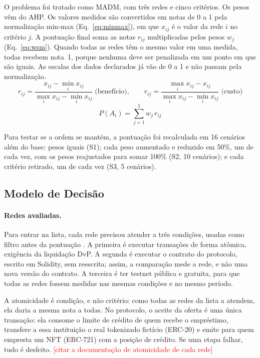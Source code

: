 \documentclass[10pt,a4paper]{article}
\newcommand{\pendente}[1]{\textcolor{red}{[#1]}}
\begin{document}
O problema foi tratado como MADM, com três redes e cinco critérios. Os pesos vêm do AHP. Os valores medidos são convertidos em notas de 0 a 1 pela normalização min-max (Eq.~\ref{eq:minmax}), em que $x_{ij}$ é o valor da rede $i$ no critério $j$. A pontuação final soma as notas $r_{ij}$ multiplicadas pelos pesos $w_j$ (Eq.~\ref{eq:wsm}). Quando todas as redes têm o mesmo valor em uma medida, todas recebem nota~1, porque nenhuma deve ser penalizada em um ponto em que são iguais. As escalas dos dados declarados já vão de 0 a 1 e não passam pela normalização.
\begin{equation}\label{eq:minmax}
r_{ij} = \frac{x_{ij} - \min_i x_{ij}}{\max_i x_{ij} - \min_i x_{ij}} \;\text{(benefício)}, \qquad
r_{ij} = \frac{\max_i x_{ij} - x_{ij}}{\max_i x_{ij} - \min_i x_{ij}} \;\text{(custo)}
\end{equation}
\begin{equation}\label{eq:wsm}
P(A_i) = \sum_{j=1}^{5} w_j \, r_{ij}
\end{equation}

Para testar se a ordem se mantém, a pontuação foi recalculada em 16 cenários além do base: pesos iguais (S1); cada peso aumentado e reduzido em 50\%, um de cada vez, com os pesos reajustados para somar 100\% (S2, 10 cenários); e cada critério retirado, um de cada vez (S3, 5 cenários).

\subsection{Modelo de Decisão}

\paragraph{Redes avaliadas.} Para entrar na lista, cada rede precisou atender a três condições, usadas como filtro antes da pontuação \cite{baninemeh2023}. A primeira é executar transações de forma atômica, exigência da liquidação DvP. A segunda é executar o contrato do protocolo, escrito em Solidity, sem reescrita; assim, a comparação mede a rede, e não uma nova versão do contrato. A terceira é ter testnet pública e gratuita, para que todas as redes fossem medidas nas mesmas condições e no mesmo período.

A atomicidade é condição, e não critério: como todas as redes da lista a atendem, ela daria a mesma nota a todas. No protocolo, o aceite da oferta é uma única transação: ela consome o limite de crédito de quem recebe o empréstimo, transfere a essa instituição o real tokenizado fictício (ERC-20) e emite para quem empresta um NFT (ERC-721) com a posição de crédito. Se uma etapa falhar, tudo é desfeito. \pendente{citar a documentação de atomicidade de cada rede}
\end{document}
